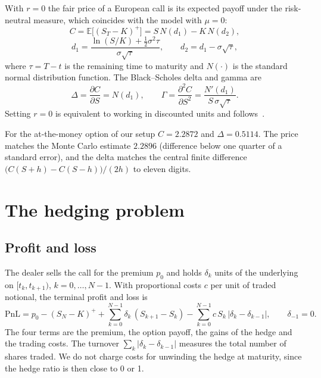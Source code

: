 \documentclass[11pt,a4paper]{article}
\newcommand{\E}{\mathbb{E}}
\newcommand{\PnL}{\mathrm{PnL}}
\begin{document}
With $r = 0$ the fair price of a European call is its expected payoff under the risk-neutral
measure, which coincides with the model with $\mu = 0$:
\begin{equation}
  C = \E\big[(S_T - K)^+\big] = S\,N(d_1) - K\,N(d_2),
\end{equation}
\begin{equation}
  d_1 = \frac{\ln(S/K) + \tfrac12 \sigma^2 \tau}{\sigma\sqrt{\tau}}, \qquad d_2 = d_1 - \sigma\sqrt{\tau},
\end{equation}
where $\tau = T - t$ is the remaining time to maturity and $N(\cdot)$ is the standard normal
distribution function. The Black--Scholes delta and gamma are
\begin{equation}
  \Delta = \frac{\partial C}{\partial S} = N(d_1), \qquad
  \Gamma = \frac{\partial^2 C}{\partial S^2} = \frac{N'(d_1)}{S\,\sigma\sqrt{\tau}} .
\end{equation}
Setting $r = 0$ is equivalent to working in discounted units and follows~\cite{buehler2019}.

For the at-the-money option of our setup $C = 2.2872$ and $\Delta = 0.5114$. The price matches the
Monte Carlo estimate $2.2896$ (difference below one quarter of a standard error), and the delta
matches the central finite difference $\big(C(S+h) - C(S-h)\big)/(2h)$ to eleven digits.

\section{The hedging problem}

\subsection{Profit and loss}

The dealer sells the call for the premium $p_0$ and holds $\delta_k$ units of the underlying on
$[t_k, t_{k+1})$, $k = 0, \dots, N-1$. With proportional costs $c$ per unit of traded notional,
the terminal profit and loss is
\begin{equation}\label{eq:pnl}
  \PnL = p_0 - (S_N - K)^+ + \sum_{k=0}^{N-1} \delta_k \,(S_{k+1} - S_k)
       - \sum_{k=0}^{N-1} c\, S_k \,\lvert \delta_k - \delta_{k-1} \rvert ,
  \qquad \delta_{-1} = 0 .
\end{equation}
The four terms are the premium, the option payoff, the gains of the hedge and the trading costs.
The turnover $\sum_k \lvert \delta_k - \delta_{k-1}\rvert$ measures the total number of shares traded.
We do not charge costs for unwinding the hedge at maturity, since the hedge ratio is then close to
0 or 1.
\end{document}
